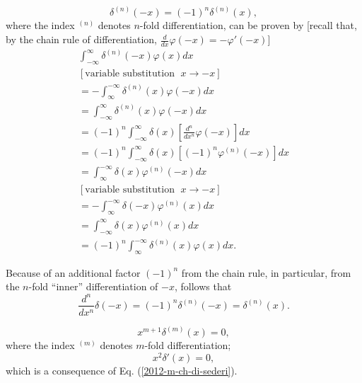  \begin{equation}
 \delta^{(n)}(-x) =(-1)^n\delta^{(n)}(x)
,
 \end{equation}
where the index $^{(n)}$ denotes $n$-fold differentiation,
can be proven by
[recall that, by the chain rule of differentiation, $\frac{d}{dx} \varphi (-x)  = - \varphi' (-x)$]
{\color{OliveGreen}
\bproof
 \begin{equation}
 \begin{split}
\int _{-\infty}^\infty \delta^{(n)} (-x)  \varphi (x)  dx  \\
[\textrm{variable substitution }\; x \rightarrow -x]\\
=
-\int _\infty^{-\infty} \delta^{(n)} (x)  \varphi (-x) dx \\
=
\int _{-\infty}^\infty \delta^{(n)} (x)  \varphi (-x) dx \\
 =
(-1)^n \int _{-\infty}^\infty \delta (x) \left[ \frac{d^n}{dx^n}  \varphi  (-x)\right] dx \\
 =
(-1)^n \int _{-\infty}^\infty \delta (x) \left[(-1)^n  \varphi^{(n)} (-x)\right] dx \\
 =
\int _\infty^{-\infty} \delta (x) \varphi^{(n)} (-x) dx \\
[\textrm{variable substitution }\; x \rightarrow -x]\\
=
-\int _\infty^{-\infty} \delta (-x) \varphi^{(n)} (x) dx \\
=
\int  _{-\infty}^\infty \delta (x) \varphi^{(n)} (x) dx \\
=
(-1)^n\int _\infty^{-\infty} \delta^{(n)} (x) \varphi (x) dx   .
 \end{split}
 \end{equation}
\eproof
}


Because of an additional factor $(-1)^n$ from the chain rule,
in particular, from the $n$-fold ``inner'' differentiation of $-x$, follows that
 \begin{equation}
 \frac{d^n}{dx^n}\delta(-x) = (-1)^n \delta^{(n)}(-x)  = \delta^{(n)}(x).
 \end{equation}

 \begin{equation}
 x^{m+1}\delta^{(m)}(x)=0
,
 \end{equation}
 where the index $^{(m)}$ denotes $m$-fold differentiation;
 \begin{equation}
 x^2\delta '(x)=0,
 \end{equation}
which is a  consequence of Eq. (\ref{2012-m-ch-di-sederi}).

